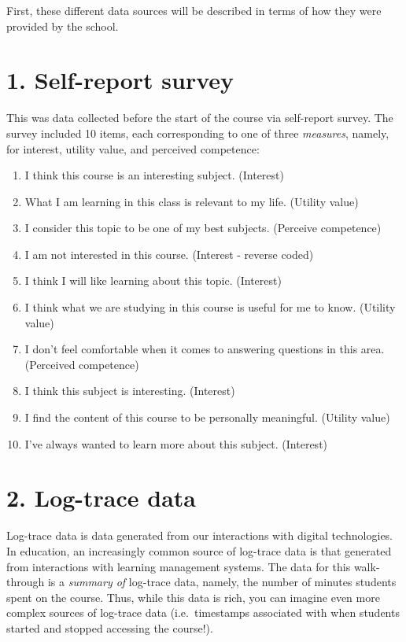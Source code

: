 \documentclass[]{book}
\providecommand{\tightlist}{%
  \setlength{\itemsep}{0pt}\setlength{\parskip}{0pt}}
\begin{document}
First, these different data sources will be described in terms of how
they were provided by the school.

\section{1. Self-report survey}\label{self-report-survey}

This was data collected before the start of the course via self-report
survey. The survey included 10 items, each corresponding to one of three
\emph{measures}, namely, for interest, utility value, and perceived
competence:

\begin{enumerate}
\def\labelenumi{\arabic{enumi}.}
\tightlist
\item
  I think this course is an interesting subject. (Interest)
\item
  What I am learning in this class is relevant to my life. (Utility
  value)
\item
  I consider this topic to be one of my best subjects. (Perceive
  competence)
\item
  I am not interested in this course. (Interest - reverse coded)
\item
  I think I will like learning about this topic. (Interest)
\item
  I think what we are studying in this course is useful for me to know.
  (Utility value)
\item
  I don't feel comfortable when it comes to answering questions in this
  area. (Perceived competence)
\item
  I think this subject is interesting. (Interest)
\item
  I find the content of this course to be personally meaningful.
  (Utility value)
\item
  I've always wanted to learn more about this subject. (Interest)
\end{enumerate}

\section{2. Log-trace data}\label{log-trace-data}

Log-trace data is data generated from our interactions with digital
technologies. In education, an increasingly common source of log-trace
data is that generated from interactions with learning management
systems. The data for this walk-through is a \emph{summary of} log-trace
data, namely, the number of minutes students spent on the course. Thus,
while this data is rich, you can imagine even more complex sources of
log-trace data (i.e.~timestamps associated with when students started
and stopped accessing the course!).
\end{document}
